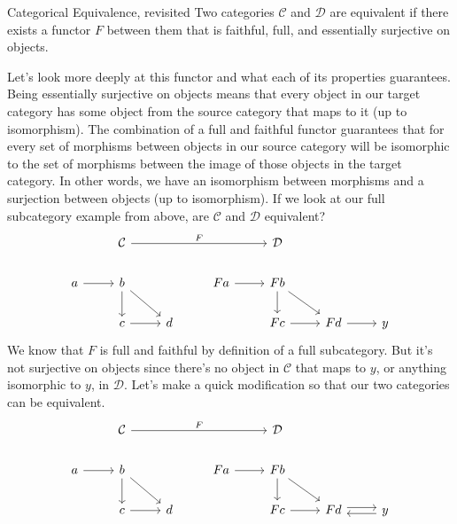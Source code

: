 \documentclass[12pt]{article}
\newcounter{examp}
\begin{document}
\begin{definition}{Categorical Equivalence, revisited}{}
    Two categories $\mathcal{C}$ and $\mathcal{D}$ are equivalent if there exists a functor $F$ between them that is faithful, full, and essentially surjective on objects.
\end{definition}

Let's look more deeply at this functor and what each of its properties guarantees.
Being essentially surjective on objects means that every object in our target category has some object from the source category that maps to it (up to isomorphism).
The combination of a full and faithful functor guarantees that for every set of morphisms between objects in our source category will be isomorphic to the set of morphisms between the image of those objects in the target category.
In other words, we have an isomorphism between morphisms and a surjection between objects (up to isomorphism).
If we look at our full subcategory example from above, are $\mathcal{C}$ and $\mathcal{D}$ equivalent?
\[\begin{tikzcd}
        & {\mathcal{C}} &&& {\mathcal{D}} \\
        a & b && Fa & Fb \\
        & c & d && Fc & Fd & y
        \arrow["F", from=1-2, to=1-5]
        \arrow[from=2-1, to=2-2]
        \arrow[from=2-2, to=3-2]
        \arrow[from=2-2, to=3-3]
        \arrow[from=2-4, to=2-5]
        \arrow[from=2-5, to=3-5]
        \arrow[from=2-5, to=3-6]
        \arrow[from=3-2, to=3-3]
        \arrow[from=3-5, to=3-6]
        \arrow[from=3-6, to=3-7]
    \end{tikzcd}\]
We know that $F$ is full and faithful by definition of a full subcategory.
But it's not surjective on objects since there's no object in $\mathcal{C}$ that maps to $y$, or anything isomorphic to $y$, in $\mathcal{D}$.
Let's make a quick modification so that our two categories can be equivalent.
\[\begin{tikzcd}
        & {\mathcal{C}} &&& {\mathcal{D}} \\
        a & b && Fa & Fb \\
        & c & d && Fc & Fd & y
        \arrow["F", from=1-2, to=1-5]
        \arrow[from=2-1, to=2-2]
        \arrow[from=2-2, to=3-2]
        \arrow[from=2-2, to=3-3]
        \arrow[from=2-4, to=2-5]
        \arrow[from=2-5, to=3-5]
        \arrow[from=2-5, to=3-6]
        \arrow[from=3-2, to=3-3]
        \arrow[from=3-5, to=3-6]
        \arrow[shift left, from=3-6, to=3-7]
        \arrow[shift left, from=3-7, to=3-6]
    \end{tikzcd}\]
\end{document}
